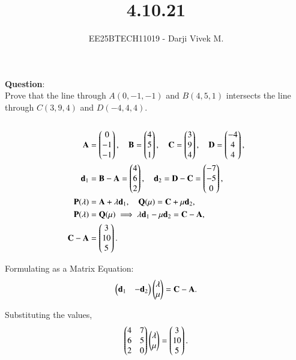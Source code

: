 \documentclass[journal]{IEEEtran}
\begin{document}


\title{4.10.21}
\author{EE25BTECH11019 - Darji Vivek M.}
{\let\newpage\relax\maketitle}

\renewcommand{\thefigure}{\theenumi}
\renewcommand{\thetable}{\theenumi}
\setlength{\intextsep}{10pt}
\renewcommand{\thetable}{\theenumi}

\textbf{Question}:\\
Prove that the line through $A(0,-1,-1)$ and $B(4,5,1)$ intersects the line through $C(3,9,4)$ and $D(-4,4,4)$.\\[4pt]

\solution \\[-2mm]
\begin{align}
\mathbf{A}&=\begin{pmatrix}0\\-1\\-1\end{pmatrix},\quad
\mathbf{B}=\begin{pmatrix}4\\5\\1\end{pmatrix},\quad
\mathbf{C}=\begin{pmatrix}3\\9\\4\end{pmatrix},\quad
\mathbf{D}=\begin{pmatrix}-4\\4\\4\end{pmatrix},\\
\mathbf{d}_1&=\mathbf{B}-\mathbf{A}=\begin{pmatrix}4\\6\\2\end{pmatrix},\quad
\mathbf{d}_2=\mathbf{D}-\mathbf{C}=\begin{pmatrix}-7\\-5\\0\end{pmatrix},\\
\mathbf{P}(\lambda)&=\mathbf{A}+\lambda\mathbf{d}_1,\quad
\mathbf{Q}(\mu)=\mathbf{C}+\mu\mathbf{d}_2,\\
\mathbf{P}(\lambda)&=\mathbf{Q}(\mu)\implies 
\lambda\mathbf{d}_1-\mu\mathbf{d}_2=\mathbf{C}-\mathbf{A},\\
\mathbf{C}-\mathbf{A}&=\begin{pmatrix}3\\10\\5\end{pmatrix}.
\end{align}

Formulating as a Matrix Equation:
\begin{align}
\begin{pmatrix}\mathbf{d}_1 & -\mathbf{d}_2\end{pmatrix}\begin{pmatrix}\lambda\\\mu\end{pmatrix}=\mathbf{C}-\mathbf{A}.
\end{align}

Substituting the values,
\begin{align}
\begin{pmatrix}4 & 7\\6 & 5\\2 & 0\end{pmatrix}\begin{pmatrix}\lambda\\\mu\end{pmatrix}=\begin{pmatrix}3\\10\\5\end{pmatrix}.
\end{align}
\end{document}
